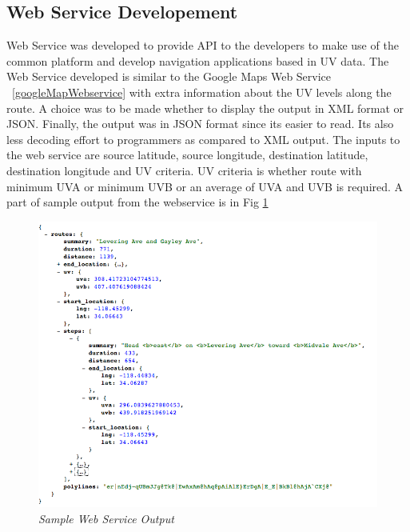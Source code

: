 \documentclass[10pt]{sigplan-proc-varsize}
\begin{document}
\subsection{Web Service Developement}
Web Service was developed to provide API to the developers to make use of the common platform and develop navigation applications based in UV data. The Web Service developed is similar to the Google Maps Web Service ~\ref{googleMapWebservice} with extra information about the UV levels along the route. A choice was to be made whether to display the output in XML format or JSON. Finally, the output was in JSON format since its easier to read. Its also less decoding effort to programmers as compared to XML output. The inputs to the web service are source latitude, source longitude, destination latitude, destination longitude and UV criteria. UV criteria is whether route with minimum UVA or minimum UVB or an average of UVA and UVB is required. A part of sample output from the webservice is in Fig \ref{fig:webServiceOutput}
\begin{figure}
\begin{center}
\includegraphics[scale=0.35]{webServiceOutput.png}
\caption{\small \sl Sample Web Service Output}
\label{fig:webServiceOutput}
\end{center}
\end{figure}
\end{document}
